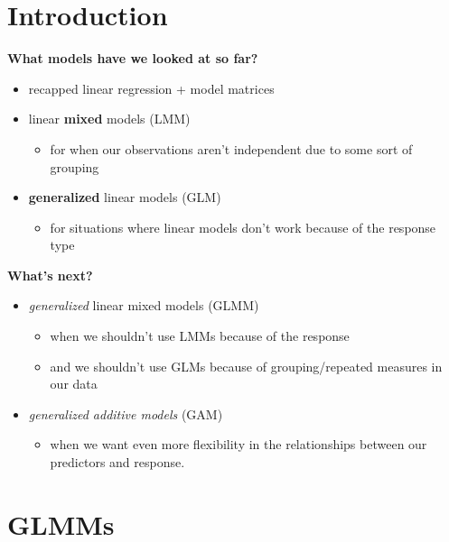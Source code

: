 \documentclass[
  openany]{book}
\providecommand{\tightlist}{%
  \setlength{\itemsep}{0pt}\setlength{\parskip}{0pt}}
\begin{document}
\hypertarget{introduction-5}{%
\section{Introduction}\label{introduction-5}}

\textbf{What models have we looked at so far?}

\begin{itemize}
\item
  recapped linear regression + model matrices
\item
  linear \textbf{mixed} models (LMM)

  \begin{itemize}
  \tightlist
  \item
    for when our observations aren't independent due to some sort of grouping
  \end{itemize}
\item
  \textbf{generalized} linear models (GLM)

  \begin{itemize}
  \tightlist
  \item
    for situations where linear models don't work because of the response type
  \end{itemize}
\end{itemize}

\textbf{What's next?}

\begin{itemize}
\item
  \emph{generalized} linear mixed models (GLMM)

  \begin{itemize}
  \tightlist
  \item
    when we shouldn't use LMMs because of the response
  \item
    and we shouldn't use GLMs because of grouping/repeated measures in our data
  \end{itemize}
\item
  \emph{generalized additive models} (GAM)

  \begin{itemize}
  \tightlist
  \item
    when we want even more flexibility in the relationships between our predictors and response.
  \end{itemize}
\end{itemize}

\hypertarget{glmms}{%
\section{GLMMs}\label{glmms}}
\end{document}
